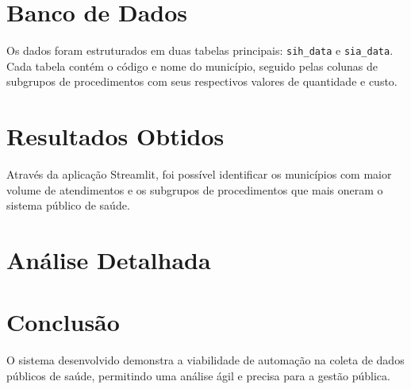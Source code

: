 \documentclass[12pt,a4paper]{article}
\begin{document}
\section{Banco de Dados}
Os dados foram estruturados em duas tabelas principais: \texttt{sih\_data} e \texttt{sia\_data}. Cada tabela contém o código e nome do município, seguido pelas colunas de subgrupos de procedimentos com seus respectivos valores de quantidade e custo.

\section{Resultados Obtidos}
Através da aplicação Streamlit, foi possível identificar os municípios com maior volume de atendimentos e os subgrupos de procedimentos que mais oneram o sistema público de saúde.

\section{Análise Detalhada}
\lipsum[1-20] %
\newpage
\lipsum[21-40]
\newpage
\lipsum[41-60]
\newpage
\lipsum[61-80]
\newpage
\lipsum[81-100]
\newpage
\lipsum[101-120]

\section{Conclusão}
O sistema desenvolvido demonstra a viabilidade de automação na coleta de dados públicos de saúde, permitindo uma análise ágil e precisa para a gestão pública.
\end{document}
